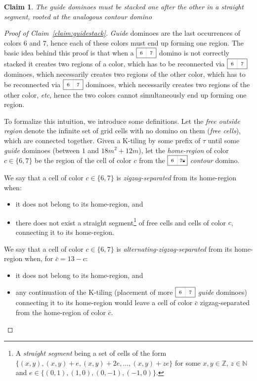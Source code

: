 \documentclass[11pt,a4paper]{article}
\newtheorem{claim}{\textbf{Claim}}
\newcommand{\N}{\mathbb{N}}
\newcommand{\Z}{\mathbb{Z}}
\newcommand{\1}{\mathbb{1}}
\newcommand{\0}{\mathbb{0}}
\newcommand{\hdomino}[2]{\raisebox{-4pt}{\tikz[scale=.5]{\draw[black!25] (1,0) -- ++ (0,1); \draw (0,0) rectangle ++ (2,1); \node at (.5,.5) {\scriptsize $#1$}; \node at (1.5,.5) {\scriptsize $#2$};}}}
\newcommand{\crown}{\tikz[scale=.05]{
  \fill (0,0) -- (0,2) -- (.5,.5) -- (1,2) -- (1.5,.5) -- (2,2) -- (2,0) -- cycle;
  \draw (0,2) circle (5pt);
  \draw (1,2) circle (5pt);
  \draw (2,2) circle (5pt);
}}
\begin{document}
\begin{claim}
  The {\em guide} dominoes must be stacked one after the other in a straight
  segment, rooted at the analogous {\em contour} domino
\end{claim}

\begin{proof}[Proof of Claim~\ref{claim:guidestack}]
  {\em Guide} dominoes are the last occurrences of colors $6$ and $7$, hence
  each of these colors must end up forming one region.
  The basic idea behind this proof is that when a $\hdomino{6}{7}$ domino is
  not correctly stacked it creates two regions of a color, which has to be
  reconnected via $\hdomino{6}{7}$ dominoes, which necessarily creates two
  regions of the other color, which has to be reconnected via $\hdomino{6}{7}$
  dominoes, which necessarily creates two regions of the other color, {\em
  etc}, hence the two colors cannot simultaneously end up forming one region.

  \medskip

  To formalize this intuition, we introduce some definitions.
  Let the {\em free outside region} denote the infinite set of grid cells with
  no domino on them ({\em free cells}), which are connected together.
  Given a K-tiling by some prefix of $\tau$ until some {\em guide} dominoes
  (between $1$ and $18m^2+12m$), let the {\em home-region} of color $c \in
  \{6,7\}$ be the region of the cell of color $c$ from the
  $\hdomino{6}{7{\crown}}$ {\em contour} domino.

  We say that a cell of color $c \in \{6,7\}$ is {\em zigzag-separated} from
  its home-region when:
  \begin{itemize}
    \item it does not belong to its home-region, and
    \item there does not exist a straight segment\footnote{A {\em straight
      segment} being a set of cells of the form
      $\{(x,y),(x,y)+e,(x,y)+2e,\dots,(x,y)+ze\}$ for some $x,y \in \Z$, $z \in
      \N$ and $e \in \{(0,1),(1,0),(0,-1),(-1,0)\}$.} of free cells and cells
      of color $c$, connecting it to its home-region.
  \end{itemize}
  We say that a cell of color $c \in \{6,7\}$ is {\em
  alternating-zigzag-separated} from its home-region when, for $\bar{c}=13-c$:
  \begin{itemize}
    \item it does not belong to its home-region, and
    \item any continuation of the K-tiling (placement of more $\hdomino{6}{7}$ {\em
      guide} dominoes) connecting it to its home-region would leave a cell of
      color $\bar{c}$ zigzag-separated from the home-region of color $\bar{c}$.
  \end{itemize}
  

\end{proof}
\end{document}
